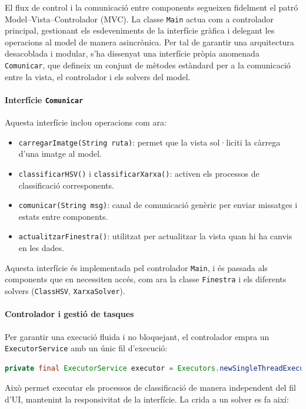 \documentclass{ieeetj}
\begin{document}
El flux de control i la comunicació entre components segueixen fidelment el patró Model–Vista–Controlador (MVC). La classe \texttt{Main} actua com a controlador principal, gestionant els esdeveniments de la interfície gràfica i delegant les operacions al model de manera asincrònica. Per tal de garantir una arquitectura desacoblada i modular, s'ha dissenyat una interfície pròpia anomenada \texttt{Comunicar}, que defineix un conjunt de mètodes estàndard per a la comunicació entre la vista, el controlador i els solvers del model.

\paragraph{Interfície \texttt{Comunicar}}

Aquesta interfície inclou operacions com ara:

\begin{itemize}
  \item \texttt{carregarImatge(String ruta)}: permet que la vista sol·liciti la càrrega d'una imatge al model.
  \item \texttt{classificarHSV()} i \texttt{classificarXarxa()}: activen els processos de classificació corresponents.
  \item \texttt{comunicar(String msg)}: canal de comunicació genèric per enviar missatges i estats entre components.
  \item \texttt{actualitzarFinestra()}: utilitzat per actualitzar la vista quan hi ha canvis en les dades.
\end{itemize}

Aquesta interfície és implementada pel controlador \texttt{Main}, i és passada als components que en necessiten accés, com ara la classe \texttt{Finestra} i els diferents solvers (\texttt{ClassHSV}, \texttt{XarxaSolver}).

\paragraph{Controlador i gestió de tasques}

Per garantir una execució fluida i no bloquejant, el controlador empra un \texttt{ExecutorService} amb un únic fil d'execució:

\begin{lstlisting}[language=Java]
private final ExecutorService executor = Executors.newSingleThreadExecutor();
\end{lstlisting}

Això permet executar els processos de classificació de manera independent del fil d'UI, mantenint la responsivitat de la interfície. La crida a un solver es fa així:
\end{document}
